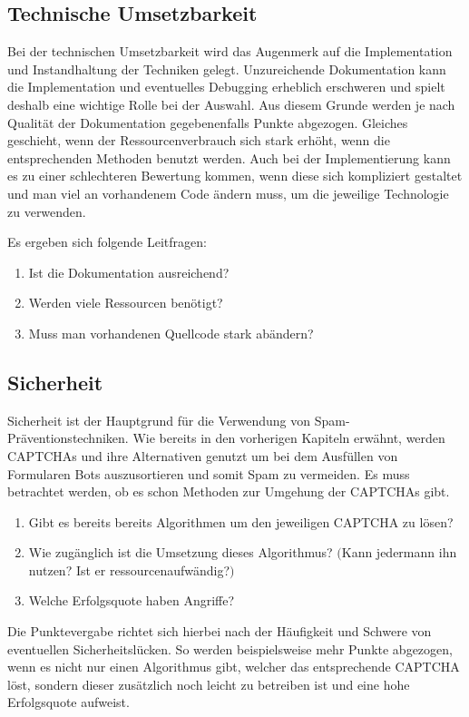 \subsection{Technische Umsetzbarkeit}
\label{ch:matrix:aspekte:tu}

Bei der technischen Umsetzbarkeit wird das Augenmerk auf die Implementation und Instandhaltung der Techniken gelegt.
Unzureichende Dokumentation kann die Implementation und eventuelles Debugging erheblich erschweren
und spielt deshalb eine wichtige Rolle bei der Auswahl.
Aus diesem Grunde werden je nach Qualität der Dokumentation gegebenenfalls Punkte abgezogen.
Gleiches geschieht, wenn der Ressourcenverbrauch sich stark erhöht, wenn die entsprechenden Methoden benutzt werden.
Auch bei der Implementierung kann es zu einer schlechteren Bewertung kommen, wenn diese sich kompliziert gestaltet und man viel an vorhandenem Code ändern muss,
um die jeweilige Technologie zu verwenden.

Es ergeben sich folgende Leitfragen:
\begin{enumerate}
    \item Ist die Dokumentation ausreichend? 
    \item Werden viele Ressourcen benötigt?
    \item Muss man vorhandenen Quellcode stark abändern?
\end{enumerate}
 
\subsection{Sicherheit}
\label{ch:matrix:aspekte:sicherheit}
Sicherheit ist der Hauptgrund für die Verwendung von Spam-Präventions\-techniken.
Wie bereits in den vorherigen Kapiteln erwähnt, werden CAPTCHAs und ihre Alternativen genutzt um bei dem Ausfüllen von Formularen Bots auszusortieren
und somit Spam zu vermeiden.
Es muss betrachtet werden, ob es schon Methoden zur Umgehung der CAPTCHAs gibt.
\begin{enumerate}
    \item Gibt es bereits bereits Algorithmen um den jeweiligen CAPTCHA zu lösen?
    \item Wie zugänglich ist die Umsetzung dieses Algorithmus? $($Kann jedermann ihn nutzen? Ist er ressourcenaufwändig?$)$
    \item Welche Erfolgsquote haben Angriffe?
\end{enumerate}

Die Punktevergabe richtet sich hierbei nach der Häufigkeit und Schwere von eventuellen Sicherheitslücken.
So werden beispielsweise mehr Punkte abgezogen, wenn es nicht nur einen Algorithmus gibt, welcher das entsprechende CAPTCHA löst,
sondern dieser zusätzlich noch leicht zu betreiben ist und eine hohe Erfolgsquote aufweist.


